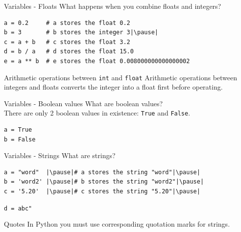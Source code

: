 \documentclass[dvipsnames, svgnames, x11names]{beamer}
\begin{document}
\begin{frame}[fragile]{Variables - Floats}
What happens when you combine floats and integers? \pause
\begin{verbatim}
a = 0.2     # a stores the float 0.2
b = 3       # b stores the integer 3|\pause|
c = a + b   # c stores the float 3.2
d = b / a   # d stores the float 15.0
e = a ** b  # e stores the float 0.008000000000000002
\end{verbatim}
\pause
\begin{block}{Arithmetic operations between \texttt{int} and \texttt{float}}
Arithmetic operations between integers and floats converts the integer into a float first before operating.
\end{block}
\end{frame}

\begin{frame}[fragile]{Variables - Boolean values}
What are boolean values?\pause\\
There are only 2 boolean values in existence: \texttt{True} and \texttt{False}.\pause
\begin{verbatim}
a = True
b = False
\end{verbatim}


\vspace{1cm}
\begin{overlayarea}{\textwidth}{3cm}
\end{overlayarea}
\end{frame}

\begin{frame}[fragile]{Variables - Strings}
What are strings?\pause\\

\begin{verbatim}
a = "word"  |\pause|# a stores the string "word"|\pause|
b = 'word2' |\pause|# b stores the string "word2"|\pause|
c = '5.20'  |\pause|# c stores the string "5.20"|\pause|
\end{verbatim}
\vspace{-0.275em}
\texttt{d = }{\color{BrickRed}\texttt{\textquotesingle abc"}}\pause {} \pause
\begin{block}{Quotes}
In Python you must use corresponding quotation marks for strings.
\end{block}
\end{frame}
\end{document}
